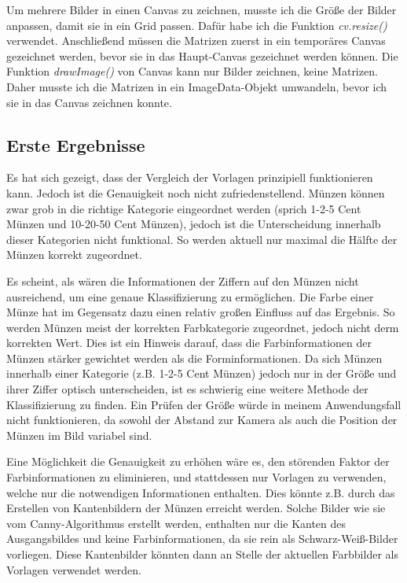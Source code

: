Um mehrere Bilder in einen Canvas zu zeichnen, musste ich die Größe der Bilder anpassen, damit sie in ein Grid passen. Dafür habe ich die Funktion \textit{cv.resize()} verwendet. Anschließend müssen die Matrizen zuerst in ein temporäres Canvas gezeichnet werden, bevor sie in das Haupt-Canvas gezeichnet werden können. Die Funktion \textit{drawImage()} von Canvas kann nur Bilder zeichnen, keine Matrizen. Daher musste ich die Matrizen in ein ImageData-Objekt umwandeln, bevor ich sie in das Canvas zeichnen konnte.
\subsection{Erste Ergebnisse}
Es hat sich gezeigt, dass der Vergleich der Vorlagen prinzipiell funktionieren kann. Jedoch ist die Genauigkeit  noch nicht zufriedenstellend. Münzen können zwar grob in die richtige Kategorie eingeordnet werden (sprich 1-2-5 Cent Münzen und 10-20-50 Cent Münzen), jedoch ist die Unterscheidung innerhalb dieser Kategorien nicht funktional. So werden aktuell nur maximal die Hälfte der Münzen korrekt zugeordnet.

Es scheint, als wären die Informationen der Ziffern auf den Münzen nicht ausreichend, um eine genaue Klassifizierung zu ermöglichen. Die Farbe einer Münze hat im Gegensatz dazu einen relativ großen Einfluss auf das Ergebnis. So werden Münzen meist der korrekten Farbkategorie zugeordnet, jedoch nicht derm korrekten Wert. Dies ist ein Hinweis darauf, dass die Farbinformationen der Münzen stärker gewichtet werden als die Forminformationen. Da sich Münzen innerhalb einer Kategorie (z.B. 1-2-5 Cent Münzen) jedoch nur in der Größe und ihrer Ziffer optisch unterscheiden, ist es schwierig eine weitere Methode der Klassifizierung zu finden. Ein Prüfen der Größe würde in meinem Anwendungsfall nicht funktionieren, da sowohl der Abstand zur Kamera als auch die Position der Münzen im Bild variabel sind. 

Eine Möglichkeit die Genauigkeit zu erhöhen wäre es, den störenden Faktor der Farbinformationen zu eliminieren, und stattdessen nur Vorlagen zu verwenden, welche nur die notwendigen Informationen enthalten. Dies könnte z.B. durch das Erstellen von Kantenbildern der Münzen erreicht werden. Solche Bilder wie sie vom Canny-Algorithmus erstellt werden, enthalten nur die Kanten des Ausgangsbildes und keine Farbinformationen, da sie rein als Schwarz-Weiß-Bilder vorliegen. Diese Kantenbilder könnten dann an Stelle der aktuellen Farbbilder als Vorlagen verwendet werden.

